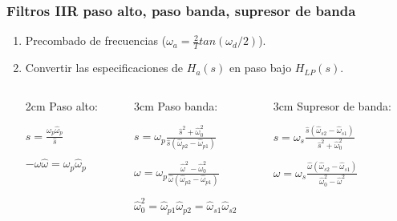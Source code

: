 \documentclass[handout]{beamer}
\numberwithin{section}{part}
\begin{document}
\begin{frame}
\frametitle{Filtros  IIR paso alto, paso banda, supresor de banda}
\small
\vspace{-0.4cm}
  \begin{enumerate}
  \item Precombado de frecuencias ($\omega_a=\frac{2}{T}tan(\omega_d/2)$).%
  \vspace{-0.1cm}
  \item Convertir las especificaciones de $H_a(s)$ en paso bajo $H_{LP}(s)$.
  \vspace{0.1cm}
  \begin{columns}[T]
    \hspace{0.8cm}\begin{column}{2cm}
    \scriptsize
    Paso alto:

    \vspace{0.2cm}

    $s=\frac{\omega_p \hat \omega_p}{\hat s}$

    \vspace{0.2cm}

    $- \omega \hat \omega=\omega_p \hat \omega_p$
    \end{column}
    \hspace{-0.8cm}\begin{column}{3cm}
    \scriptsize
    Paso banda:

    \vspace{0.1cm}

    $s=\omega_p\frac{\hat s^2+\hat \omega_0^2}{\hat s (\hat \omega_{p2}-\hat \omega_{p1})}$

    $\omega=\omega_p\frac{\hat \omega^2-\hat \omega_0^2}{\hat \omega (\hat \omega_{p2}-\hat \omega_{p1})}$

    $\hat \omega_0^2=\hat \omega_{p1}\hat \omega_{p2}=\hat \omega_{s1}\hat \omega_{s2}$

    \end{column}
    \hspace{-0.8cm}\begin{column}{3cm}
    \scriptsize
    Supresor de banda:

    \vspace{0.1cm}

    $s=\omega_s\frac{\hat s (\hat \omega_{s2}-\hat \omega_{s1})}{\hat s^2+\hat \omega_0^2}$

    $\omega=\omega_s\frac{\hat \omega (\hat \omega_{s2}-\hat \omega_{s1})}{\hat \omega_0^2-\hat \omega^2}$


\end{column}
\end{columns}
\end{enumerate}
\end{frame}
\end{document}

